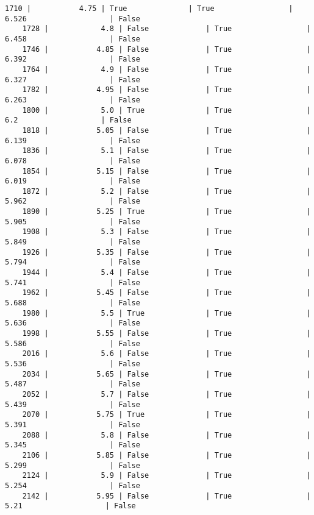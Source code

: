 \documentclass{article}
\begin{document}
\begin{Verbatim}[commandchars=\\\{\}]
    1710 |           4.75 | True              | True                 |   6.526                   | False
    1728 |            4.8 | False             | True                 |   6.458                   | False
    1746 |           4.85 | False             | True                 |   6.392                   | False
    1764 |            4.9 | False             | True                 |   6.327                   | False
    1782 |           4.95 | False             | True                 |   6.263                   | False
    1800 |            5.0 | True              | True                 |     6.2                   | False
    1818 |           5.05 | False             | True                 |   6.139                   | False
    1836 |            5.1 | False             | True                 |   6.078                   | False
    1854 |           5.15 | False             | True                 |   6.019                   | False
    1872 |            5.2 | False             | True                 |   5.962                   | False
    1890 |           5.25 | True              | True                 |   5.905                   | False
    1908 |            5.3 | False             | True                 |   5.849                   | False
    1926 |           5.35 | False             | True                 |   5.794                   | False
    1944 |            5.4 | False             | True                 |   5.741                   | False
    1962 |           5.45 | False             | True                 |   5.688                   | False
    1980 |            5.5 | True              | True                 |   5.636                   | False
    1998 |           5.55 | False             | True                 |   5.586                   | False
    2016 |            5.6 | False             | True                 |   5.536                   | False
    2034 |           5.65 | False             | True                 |   5.487                   | False
    2052 |            5.7 | False             | True                 |   5.439                   | False
    2070 |           5.75 | True              | True                 |   5.391                   | False
    2088 |            5.8 | False             | True                 |   5.345                   | False
    2106 |           5.85 | False             | True                 |   5.299                   | False
    2124 |            5.9 | False             | True                 |   5.254                   | False
    2142 |           5.95 | False             | True                 |    5.21                   | False

\end{Verbatim}
\end{document}
